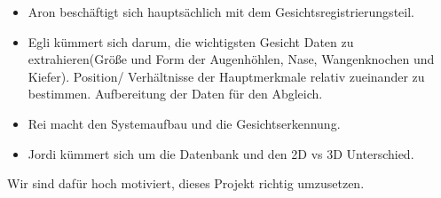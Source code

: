 \begin{itemize}
	
	\item Aron beschäftigt sich hauptsächlich mit dem Gesichtsregistrierungsteil. 
	\item Egli kümmert sich darum, die wichtigsten Gesicht Daten zu extrahieren(Größe und Form der Augenhöhlen, Nase, Wangenknochen und Kiefer). Position/ Verhältnisse der Hauptmerkmale relativ zueinander zu bestimmen. Aufbereitung der Daten für den Abgleich.
	\item Rei macht den Systemaufbau und die Gesichtserkennung.
	\item Jordi k\"ummert sich um die Datenbank und den 2D vs 3D Unterschied.

\end{itemize}
Wir sind dafür hoch motiviert, dieses Projekt richtig umzusetzen.